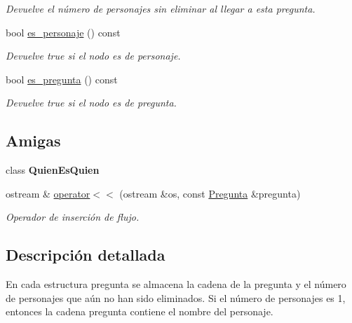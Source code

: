 \begin{DoxyCompactItemize}
\begin{DoxyCompactList}\small\item\em Devuelve el número de personajes sin eliminar al llegar a esta pregunta. \end{DoxyCompactList}\item 
bool \hyperlink{classPregunta_a034eab752003dd0d79d8c7227f79ce15}{es\+\_\+personaje} () const \hypertarget{classPregunta_a034eab752003dd0d79d8c7227f79ce15}{}\label{classPregunta_a034eab752003dd0d79d8c7227f79ce15}

\begin{DoxyCompactList}\small\item\em Devuelve true si el nodo es de personaje. \end{DoxyCompactList}\item 
bool \hyperlink{classPregunta_a6a79daf2b504199417b4ae900caabc96}{es\+\_\+pregunta} () const \hypertarget{classPregunta_a6a79daf2b504199417b4ae900caabc96}{}\label{classPregunta_a6a79daf2b504199417b4ae900caabc96}

\begin{DoxyCompactList}\small\item\em Devuelve true si el nodo es de pregunta. \end{DoxyCompactList}\end{DoxyCompactItemize}
\subsection*{Amigas}
\begin{DoxyCompactItemize}
\item 
class {\bfseries Quien\+Es\+Quien}\hypertarget{classPregunta_aa80896d1d296f1f090600015cce741f5}{}\label{classPregunta_aa80896d1d296f1f090600015cce741f5}

\item 
ostream \& \hyperlink{classPregunta_a32cc45df44752f792d258d26e3c80b0f}{operator$<$$<$} (ostream \&os, const \hyperlink{classPregunta}{Pregunta} \&pregunta)
\begin{DoxyCompactList}\small\item\em Operador de inserción de flujo. \end{DoxyCompactList}\end{DoxyCompactItemize}


\subsection{Descripción detallada}
En cada estructura pregunta se almacena la cadena de la pregunta y el número de personajes que aún no han sido eliminados. Si el número de personajes es 1, entonces la cadena pregunta contiene el nombre del personaje. 

